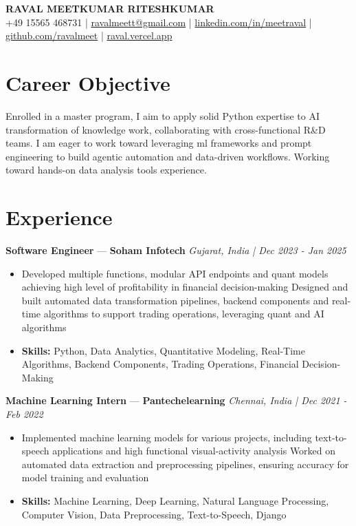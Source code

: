 \documentclass[a4paper,10pt]{article}
\begin{document}
\begin{center}
  {\Large\bfseries RAVAL MEETKUMAR RITESHKUMAR}\\[2pt]
  {\small +49 15565 468731 \;|\; \href{mailto:ravalmeett@gmail.com}{ravalmeett@gmail.com} \;|\; \href{https://www.linkedin.com/in/meetraval/}{linkedin.com/in/meetraval} \;|\; \href{https://github.com/ravalmeet}{github.com/ravalmeet} \;|\; \href{https://raval.vercel.app/}{raval.vercel.app}}
\end{center}
\vspace{-3pt}

\section*{Career Objective}
Enrolled in a master program, I aim to apply solid Python expertise to AI transformation of knowledge work, collaborating with cross-functional R\&D teams. I am eager to work toward leveraging ml frameworks and prompt engineering to build agentic automation and data-driven workflows. Working toward hands-on data analysis tools experience.\par

\section*{Experience}
\textbf{Software Engineer} — \textbf{Soham Infotech} \hfill \textit{Gujarat, India \;|\; Dec 2023 - Jan 2025}\par
\vspace{1pt}
\begin{itemize}
  \item Developed multiple functions, modular API endpoints and quant models achieving high level of profitability in financial decision-making Designed and built automated data transformation pipelines, backend components and real-time algorithms to support trading operations, leveraging quant and AI algorithms
  \item \textbf{Skills:} Python, Data Analytics, Quantitative Modeling, Real-Time Algorithms, Backend Components, Trading Operations, Financial Decision-Making
\end{itemize}
\vspace{3pt}
\textbf{Machine Learning Intern} — \textbf{Pantechelearning} \hfill \textit{Chennai, India \;|\; Dec 2021 - Feb 2022}\par
\vspace{1pt}
\begin{itemize}
  \item Implemented machine learning models for various projects, including text-to-speech applications and high functional visual-activity analysis Worked on automated data extraction and preprocessing pipelines, ensuring accuracy for model training and evaluation
  \item \textbf{Skills:} Machine Learning, Deep Learning, Natural Language Processing, Computer Vision, Data Preprocessing, Text-to-Speech, Django
\end{itemize}
\end{document}

